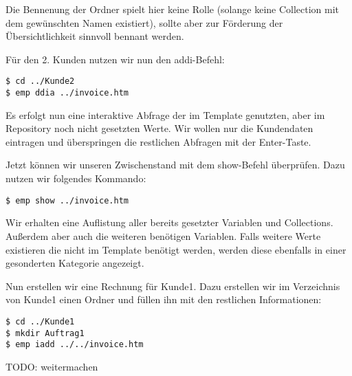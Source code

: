 Die Bennenung der Ordner spielt hier keine Rolle (solange keine Collection mit dem gewünschten Namen existiert), sollte aber zur Förderung der Übersichtlichkeit sinnvoll bennant werden.

Für den 2. Kunden nutzen wir nun den addi-Befehl:
\begin{lstlisting}[style=Bash]
$ cd ../Kunde2
$ emp ddia ../invoice.htm
\end{lstlisting}

Es erfolgt nun eine interaktive Abfrage der im Template genutzten, aber im Repository noch nicht gesetzten Werte. Wir wollen nur die Kundendaten eintragen und überspringen die restlichen Abfragen mit der Enter-Taste.

Jetzt können wir unseren Zwischenstand mit dem show-Befehl überprüfen. Dazu nutzen wir folgendes Kommando:
\begin{lstlisting}[style=Bash]
$ emp show ../invoice.htm
\end{lstlisting}

Wir erhalten eine Auflistung aller bereits gesetzter Variablen und Collections. Außerdem aber auch die weiteren benötigen Variablen. Falls weitere Werte existieren die nicht im Template benötigt werden, werden diese ebenfalls in einer gesonderten Kategorie angezeigt.

Nun erstellen wir eine Rechnung für Kunde1. Dazu erstellen wir im Verzeichnis von Kunde1 einen Ordner und füllen ihn mit den restlichen Informationen:

\begin{lstlisting}[style=Bash]
$ cd ../Kunde1
$ mkdir Auftrag1
$ emp iadd ../../invoice.htm
\end{lstlisting}

TODO: weitermachen





